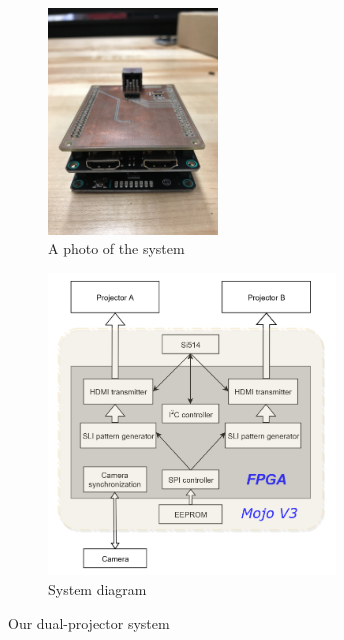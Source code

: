 \documentclass[]{spie}  %
\begin{document}

\begin{figure}
\centering
\begin{subfigure}{.5\textwidth}
  \centering
  \includegraphics[height=6cm, angle=90]{mojo.jpg}
  \caption{A photo of the system}
  \label{fig:sub1}
\end{subfigure}%
\begin{subfigure}{.5\textwidth}
  \centering
   \includegraphics[height=8cm]{sysdgv2.png}
  \caption{System diagram}
  \label{fig:sub2}
\end{subfigure}
\caption{Our dual-projector system}
\label{Fig:2}
\end{figure}
\end{document}
